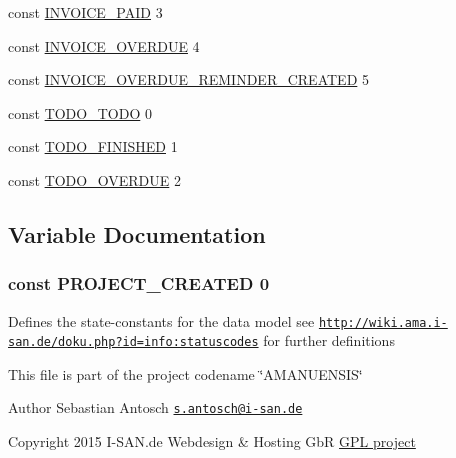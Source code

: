 \begin{DoxyCompactItemize}
\item 
const \hyperlink{a00090_a57379cd29f42791044409779ac937c96}{I\+N\+V\+O\+I\+C\+E\+\_\+\+P\+A\+I\+D} 3
\item 
const \hyperlink{a00090_afd3c01555c47fa6ca67bdc57615598c5}{I\+N\+V\+O\+I\+C\+E\+\_\+\+O\+V\+E\+R\+D\+U\+E} 4
\item 
const \hyperlink{a00090_adeb474f7f2397652f66d7ccd03f93c34}{I\+N\+V\+O\+I\+C\+E\+\_\+\+O\+V\+E\+R\+D\+U\+E\+\_\+\+R\+E\+M\+I\+N\+D\+E\+R\+\_\+\+C\+R\+E\+A\+T\+E\+D} 5
\item 
const \hyperlink{a00090_af933452fa6667e92f85af4bbf706173d}{T\+O\+D\+O\+\_\+\+T\+O\+D\+O} 0
\item 
const \hyperlink{a00090_ad3d373fc77a2c2c9607e82a446a0d0a1}{T\+O\+D\+O\+\_\+\+F\+I\+N\+I\+S\+H\+E\+D} 1
\item 
const \hyperlink{a00090_a6729c477e8a4b5fdcb2e1ec855ba86c9}{T\+O\+D\+O\+\_\+\+O\+V\+E\+R\+D\+U\+E} 2
\end{DoxyCompactItemize}


\subsection{Variable Documentation}
\hypertarget{a00090_a4a341097343a682ca8ea9c23e1cdb560}{}
\subsubsection[{P\+R\+O\+J\+E\+C\+T\+\_\+\+C\+R\+E\+A\+T\+E\+D}]{\setlength{\rightskip}{0pt plus 5cm}const P\+R\+O\+J\+E\+C\+T\+\_\+\+C\+R\+E\+A\+T\+E\+D 0}\label{a00090_a4a341097343a682ca8ea9c23e1cdb560}
Defines the state-\/constants for the data model see \href{http://wiki.ama.i-san.de/doku.php?id=info:statuscodes}{\tt http\+://wiki.\+ama.\+i-\/san.\+de/doku.\+php?id=info\+:statuscodes} for further definitions

This file is part of the project codename \char`\"{}\+A\+M\+A\+N\+U\+E\+N\+S\+I\+S\char`\"{}

\begin{DoxyAuthor}{Author}
Sebastian Antosch \href{mailto:s.antosch@i-san.de}{\tt s.\+antosch@i-\/san.\+de} 
\end{DoxyAuthor}
\begin{DoxyCopyright}{Copyright}
2015 I-\/\+S\+A\+N.\+de Webdesign \& Hosting Gb\+R \hyperlink{}{G\+P\+L project }
\end{DoxyCopyright}
\hypertarget{a00090_a9b1c98c1e105e5cc53a9bfeca3d4dfd6}{}
